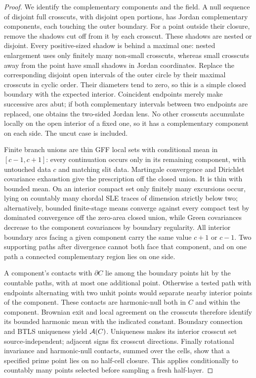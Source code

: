 \begin{proof}
We identify the complementary components and the field.  A null sequence of disjoint full crosscuts, with disjoint open portions, has Jordan complementary components, each touching the outer boundary.  For a point outside their closure, remove the shadows cut off from it by each crosscut.  These shadows are nested or disjoint.  Every positive-sized shadow is behind a maximal one: nested enlargement uses only finitely many non-small crosscuts, whereas small crosscuts away from the point have small shadows in Jordan coordinates.  Replace the corresponding disjoint open intervals of the outer circle by their maximal crosscuts in cyclic order.  Their diameters tend to zero, so this is a simple closed boundary with the expected interior.  Coincident endpoints merely make successive arcs abut; if both complementary intervals between two endpoints are replaced, one obtains the two-sided Jordan lens.  No other crosscuts accumulate locally on the open interior of a fixed one, so it has a complementary component on each side.  The uncut case is included.

Finite branch unions are thin GFF local sets with conditional mean in $[c-1,c+1]$: every continuation occurs only in its remaining component, with untouched data $c$ and matching slit data.  Martingale convergence and Dirichlet covariance exhaustion give the prescription off the closed union.  It is thin with bounded mean.  On an interior compact set only finitely many excursions occur, lying on countably many chordal SLE traces of dimension strictly below two; alternatively, bounded finite-stage means converge against every compact test by dominated convergence off the zero-area closed union, while Green covariances decrease to the component covariances by boundary regularity.  All interior boundary arcs facing a given component carry the same value $c+1$ or $c-1$.  Two supporting paths after divergence cannot both face that component, and on one path a connected complementary region lies on one side.

A component's contacts with $\partial C$ lie among the boundary points hit by the countable paths, with at most one additional point.  Otherwise a tested path with endpoints alternating with two unhit points would separate nearby interior points of the component.  These contacts are harmonic-null both in $C$ and within the component.  Brownian exit and local agreement on the crosscuts therefore identify its bounded harmonic mean with the indicated constant.  Boundary connection and BTLS uniqueness yield $\mathcal A(C)$.  Uniqueness makes its interior crosscut set source-independent; adjacent signs fix crosscut directions.  Finally rotational invariance and harmonic-null contacts, summed over the cells, show that a specified prime point lies on no half-cell closure.  This applies conditionally to countably many points selected before sampling a fresh half-layer.
\end{proof}

